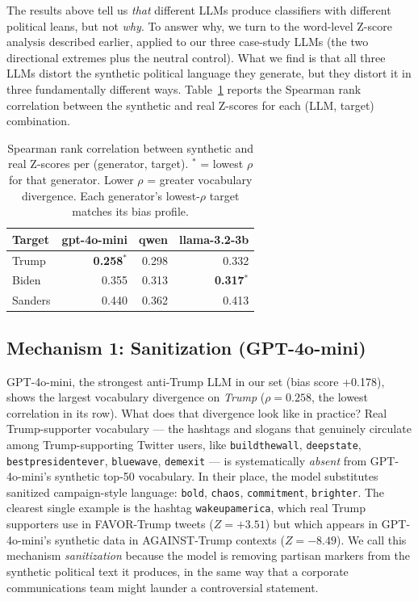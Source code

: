\documentclass[11pt]{article}
\begin{document}
The results above tell us \emph{that} different LLMs produce classifiers with different political leans, but not \emph{why}. To answer why, we turn to the word-level Z-score analysis described earlier, applied to our three case-study LLMs (the two directional extremes plus the neutral control). What we find is that all three LLMs distort the synthetic political language they generate, but they distort it in three fundamentally different ways. Table~\ref{tab:spearman} reports the Spearman rank correlation between the synthetic and real Z-scores for each (LLM, target) combination.

\begin{table}[t]
\centering
\small
\begin{tabular}{lrrr}
\toprule
\textbf{Target} & \textbf{gpt-4o-mini} & \textbf{qwen} & \textbf{llama-3.2-3b} \\
\midrule
Trump   & \textbf{0.258}$^\ast$ & 0.298 & 0.332 \\
Biden   & 0.355 & 0.313 & \textbf{0.317}$^\ast$ \\
Sanders & 0.440 & 0.362 & 0.413 \\
\bottomrule
\end{tabular}
\caption{Spearman rank correlation between synthetic and real Z-scores per (generator, target). $^\ast$ = lowest $\rho$ for that generator. Lower $\rho$ = greater vocabulary divergence. Each generator's lowest-$\rho$ target matches its bias profile.}
\label{tab:spearman}
\end{table}

\subsection{Mechanism 1: Sanitization (GPT-4o-mini)}

GPT-4o-mini, the strongest anti-Trump LLM in our set (bias score +0.178), shows the largest vocabulary divergence on \emph{Trump} ($\rho = 0.258$, the lowest correlation in its row). What does that divergence look like in practice? Real Trump-supporter vocabulary --- the hashtags and slogans that genuinely circulate among Trump-supporting Twitter users, like \texttt{buildthewall}, \texttt{deepstate}, \texttt{bestpresidentever}, \texttt{bluewave}, \texttt{demexit} --- is systematically \emph{absent} from GPT-4o-mini's synthetic top-50 vocabulary. In their place, the model substitutes sanitized campaign-style language: \texttt{bold}, \texttt{chaos}, \texttt{commitment}, \texttt{brighter}. The clearest single example is the hashtag \texttt{wakeupamerica}, which real Trump supporters use in FAVOR-Trump tweets ($Z = +3.51$) but which appears in GPT-4o-mini's synthetic data in AGAINST-Trump contexts ($Z = -8.49$). We call this mechanism \emph{sanitization} because the model is removing partisan markers from the synthetic political text it produces, in the same way that a corporate communications team might launder a controversial statement.
\end{document}

